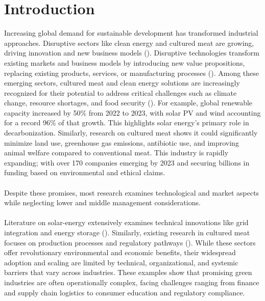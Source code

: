 
\section{Introduction}

Increasing global demand for sustainable development has transformed industrial approaches. Disruptive sectors like clean energy and cultured meat are growing, driving innovation and new business models (\textcite{SeedBlink2025, Deloitte2025}). Disruptive technologies transform existing markets and business models by introducing new value propositions, replacing existing products, services, or manufacturing processes (\textcite{Bower1995}). Among these emerging sectors, cultured meat and clean energy solutions are increasingly recognized for their potential to address critical challenges such as climate change, resource shortages, and food security (\textcite{Wageningen2022, GFI2025future}). For example, global renewable capacity increased by 50\% from 2022 to 2023, with solar PV and wind accounting for a record 96\% of that growth. This highlights solar energy's primary role in decarbonization. Similarly, research on cultured meat shows it could significantly minimize land use, greenhouse gas emissions, antibiotic use, and improving animal welfare compared to conventional meat. This industry is rapidly expanding; with over 170 companies emerging by 2023 and securing billions in funding based on environmental and ethical claims.

\paragraph*{} Despite these promises, most research examines technological and market aspects while neglecting lower and middle management considerations.

\paragraph*{} Literature on solar-energy extensively examines technical innovations like grid integration and energy storage (\textcite{SINSEL20202271}). Similarly, existing research in cultured meat focuses on production processes and regulatory pathways (\textcite{Bryant2020}). While these sectors offer revolutionary environmental and economic benefits, their widespread adoption and scaling are limited by technical, organizational, and systemic barriers that vary across industries. These examples show that promising green industries are often operationally complex, facing challenges ranging from finance and supply chain logistics to consumer education and regulatory compliance.

